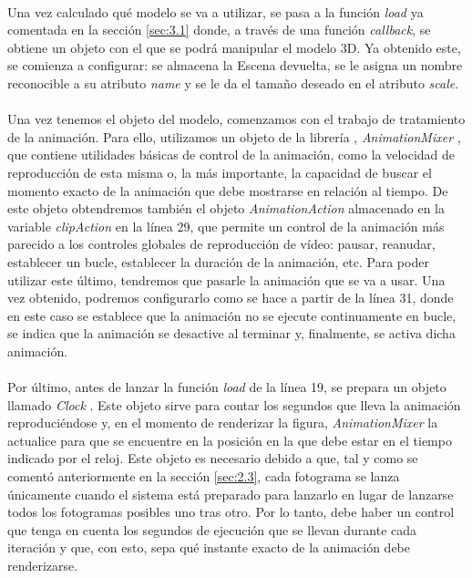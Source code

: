 \documentclass{subfiles}
\begin{document}
        \paragraph{}
        Una vez calculado qué modelo se va a utilizar, se pasa a la función \textit{load} ya comentada en la sección \ref{sec:3.1} donde, a través de una función \textit{callback}, se obtiene un objeto con el que se podrá manipular el modelo 3D. Ya obtenido este, se comienza a configurar: se almacena la Escena devuelta, se le asigna un nombre reconocible a su atributo \textit{name} y se le da el tamaño deseado en el atributo \textit{scale}.

        \paragraph{}
        Una vez tenemos el objeto del modelo, comenzamos con el trabajo de tratamiento de la animación. Para ello, utilizamos un objeto de la librería \threejs, \textit{AnimationMixer} \cite{web:threejs_animationmixer}, que contiene utilidades básicas de control de la animación, como la velocidad de reproducción de esta misma o, la más importante, la capacidad de buscar el momento exacto de la animación que debe mostrarse en relación al tiempo. De este objeto obtendremos también el objeto \textit{AnimationAction} \cite{web:threejs_animationaction} almacenado en la variable \textit{clipAction} en la línea 29, que permite un control de la animación más parecido a los controles globales de reproducción de vídeo: pausar, reanudar, establecer un bucle, establecer la duración de la animación, etc. Para poder utilizar este último, tendremos que pasarle la animación que se va a usar. Una vez obtenido, podremos configurarlo como se hace a partir de la línea 31, donde en este caso se establece que la animación no se ejecute continuamente en bucle, se indica que la animación se desactive al terminar y, finalmente, se activa dicha animación.

        \paragraph{}
        Por último, antes de lanzar la función \textit{load} de la línea 19, se prepara un objeto llamado \textit{Clock} \cite{web:threejs_clock}. Este objeto sirve para contar los segundos que lleva la animación reproduciéndose y, en el momento de renderizar la figura, \textit{AnimationMixer} la actualice para que se encuentre en la posición en la que debe estar en el tiempo indicado por el reloj. Este objeto es necesario debido a que, tal y como se comentó anteriormente en la sección \ref{sec:2.3}, cada fotograma se lanza únicamente cuando el sistema está preparado para lanzarlo en lugar de lanzarse todos los fotogramas posibles uno tras otro. Por lo tanto, debe haber un control que tenga en cuenta los segundos de ejecución que se llevan durante cada iteración y que, con esto, sepa qué instante exacto de la animación debe renderizarse.
\end{document}
